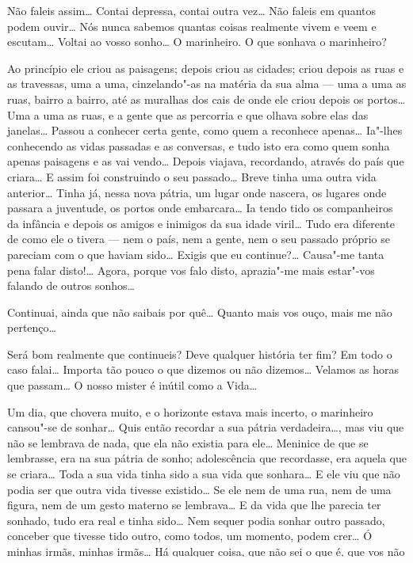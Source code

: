  Não faleis assim\ldots{} 
Contai depressa, contai outra vez\ldots{} Não
faleis em quantos podem ouvir\ldots{} 
Nós nunca sabemos quantas coisas
realmente vivem e veem e escutam\ldots{} 
Voltai ao vosso sonho\ldots{} O
marinheiro. O que sonhava o marinheiro?

  
Ao princípio ele criou as paisagens; depois criou as
cidades; criou depois as ruas e as travessas, uma a uma, 
cinzelando"-as na matéria da sua alma --- uma a
uma as ruas, bairro a bairro, até as muralhas dos cais 
de onde ele criou depois os portos\ldots{} Uma a uma as
ruas, e a gente que as percorria
e que olhava sobre elas das janelas\ldots{} 
Passou a conhecer certa gente,
como quem a reconhece apenas\ldots{} Ia"-lhes
conhecendo as vidas passadas
e as conversas, e tudo isto era como quem sonha 
apenas paisagens e as vai vendo\ldots{} 
Depois viajava, recordando, através do país que criara\ldots{}
E assim foi construindo o seu passado\ldots{}
Breve tinha uma outra vida
anterior\ldots{} Tinha já, nessa nova pátria, um lugar
onde nascera, os lugares onde passara a juventude, os
portos onde embarcara\ldots{} Ia tendo tido os companheiros
da infância e depois os amigos e inimigos da sua
idade viril\ldots{} Tudo era diferente de como ele o
tivera --- nem o país, nem a gente, nem o seu passado 
próprio se pareciam com o que haviam sido\ldots{} 
Exigis que eu continue?\ldots{} Causa"-me tanta pena falar
disto!\ldots{} Agora, porque vos falo disto, aprazia"-me
mais estar"-vos falando de outros sonhos\ldots{} 

 Continuai, ainda que não saibais
por quê\ldots{} Quanto mais vos
ouço, mais me não pertenço\ldots{}

 Será bom realmente que continueis? 
Deve qualquer história ter fim? Em todo o caso 
falai\ldots{} Importa tão pouco o que dizemos ou não
dizemos\ldots{} Velamos as horas que passam\ldots{} 
O nosso mister é inútil como a Vida\ldots{}

 Um dia, que chovera muito, e o horizonte
estava mais incerto, o marinheiro cansou"-se de
sonhar\ldots{} Quis então recordar a sua pátria
verdadeira\ldots{}, mas viu que não se lembrava 
de nada, que ela não existia
para ele\ldots{} Meninice de que se lembrasse,
era na sua pátria de sonho;
adolescência que recordasse, era aquela que se
criara\ldots{} Toda a sua
vida tinha sido a sua vida que sonhara\ldots{} 
E ele viu que não podia ser
que outra vida tivesse existido\ldots{} 
Se ele nem de uma rua, nem de uma
figura, nem de um gesto materno se lembrava\ldots{} 
E da vida que lhe parecia ter sonhado, tudo era real
e tinha sido\ldots{} Nem sequer podia sonhar outro passado,
conceber que tivesse tido outro, como todos, um
momento, podem crer\ldots{} Ó minhas irmãs,
minhas irmãs\ldots{} Há qualquer
coisa, que não sei o que é, que vos não
disse\ldots{} qualquer coisa que
explicaria isto tudo\ldots{} A minha alma 
esfria"-me\ldots{} Mal sei se tenho
estado a falar\ldots{} Falai"-me, gritai"-me,
para que eu acorde, para que
eu saiba que estou aqui ante vós e que há coisas que são apenas
sonhos\ldots{}

